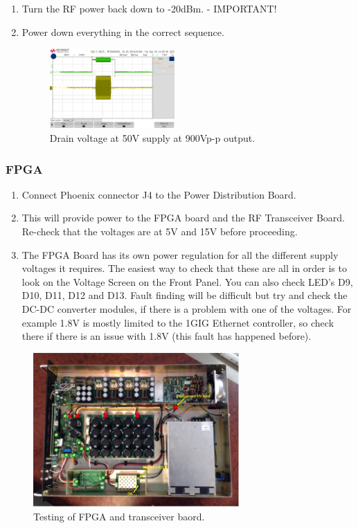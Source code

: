 \begin{enumerate}
	\item Turn the RF power back down to -20dBm. - IMPORTANT!
	\item Power down everything in the correct sequence.
		\begin{figure}[H]
			\centering
			\includegraphics[width=0.45\textwidth]{images/hardware/signal_22.jpg}
			\caption{Drain voltage at 50V supply at 900Vp-p output.}
			\label{fig:hw_amp_signals_7}
		\end{figure}
\end{enumerate}

\subsubsection{FPGA}

\begin{enumerate}
	\item Connect  Phoenix connector J4 to the Power Distribution Board.
	\item This will provide power to the FPGA board and the RF Transceiver Board. Re-check that the voltages are at 5V and 15V before proceeding.
	\item The FPGA Board has its own power regulation for all the different supply voltages it requires. The easiest way to check that these are all in order is to look on the Voltage Screen on the Front Panel. You can also check LED’s D9, D10, D11, D12 and D13. Fault finding will be difficult but try and check the DC-DC converter modules, if there is a problem with one of the voltages. For example 1.8V is mostly limited to the 1GIG Ethernet controller, so check there if there is an issue with 1.8V (this fault has happened before).
\end{enumerate}

\begin{figure}[H]
	\centering
	\includegraphics[width=0.7\textwidth]{images/hardware/box_fpga_txrx.jpg}
	\caption{Testing of FPGA and transceiver baord.}
	\label{fig:hw_box_txrx}
\end{figure}

